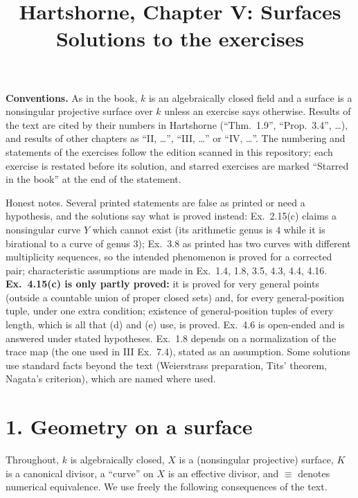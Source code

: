 \documentclass[11pt]{article}
\title{Hartshorne, Chapter V: Surfaces\\[2pt]\large Solutions to the exercises}
\author{}
\date{}
\begin{document}
\maketitle
\noindent\textbf{Conventions.} As in the book, $k$ is an algebraically closed field and a surface is a nonsingular projective surface over $k$ unless an exercise says otherwise. Results of the text are cited by their numbers in Hartshorne (``Thm.~1.9'', ``Prop.~3.4'', \dots), and results of other chapters as ``II, \dots'', ``III, \dots'' or ``IV, \dots''. The numbering and statements of the exercises follow the edition scanned in this repository; each exercise is restated before its solution, and starred exercises are marked ``Starred in the book'' at the end of the statement.

Honest notes. Several printed statements are false as printed or need a hypothesis, and the solutions say what is proved instead: Ex.~2.15(c) claims a nonsingular curve $Y$ which cannot exist (its arithmetic genus is $4$ while it is birational to a curve of genus $3$); Ex.~3.8 as printed has two curves with different multiplicity sequences, so the intended phenomenon is proved for a corrected pair; characteristic assumptions are made in Ex.~1.4, 1.8, 3.5, 4.3, 4.4, 4.16. \textbf{Ex.~4.15(c) is only partly proved:} it is proved for very general points (outside a countable union of proper closed sets) and, for every general-position tuple, under one extra condition; existence of general-position tuples of every length, which is all that (d) and (e) use, is proved. Ex.~4.6 is open-ended and is answered under stated hypotheses. Ex.~1.8 depends on a normalization of the trace map (the one used in III Ex.~7.4), stated as an assumption. Some solutions use standard facts beyond the text (Weierstrass preparation, Tits' theorem, Nagata's criterion), which are named where used.

\section*{1. Geometry on a surface}

Throughout, $k$ is algebraically closed, $X$ is a (nonsingular projective) surface, $K$ is a canonical divisor, a ``curve'' on $X$ is an effective divisor, and $\equiv$ denotes numerical equivalence. We use freely the following consequences of the text.
\end{document}
